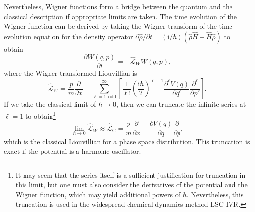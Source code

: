 Nevertheless, Wigner functions form a bridge between the quantum and the classical description if appropriate limits are taken. The time evolution of the Wigner function can be derived by taking the Wigner transform of the time-evolution equation for the density operator $\partial\hat{\rho}/\partial t = (\mathrm{i}/\hbar)(\hat{\rho}\hat{H}-\hat{H}\hat{\rho})$ to obtain\supercite{Ballentine1998}
\begin{equation}
	\frac{\partial W(q,p)}{\partial t} = -\hat{\mathcal{L}}_W W(q,p),
\end{equation}
where the Wigner transformed Liouvillian is
\begin{equation}
	\hat{\mathcal{L}}_W = \frac{p}{m} \frac{\partial}{\partial x}
	- \sum_{\ell=1,\mathrm{odd}}^{\infty}
	\left[\frac{1}{\ell!}\left(\frac{\mathrm{i}\hbar}{2}\right)^{\ell-1}\frac{\partial^{\ell} V(q)}{\partial q^{\ell}}\frac{\partial^{\ell}}{\partial p^{\ell}}\right].
\end{equation}
If we take the classical limit of $\hbar\to0$, then we can truncate the infinite series at $\ell=1$ to obtain\footnote[2]{It may seem that the series itself is a sufficient justification for truncation in this limit, but one must also consider the derivatives of the potential and the Wigner function, which may yield additional powers of $\hbar$.\supercite{Ballentine1998} Nevertheless, this truncation is used in the widespread chemical dynamics method LSC-IVR.\supercite{Shi2003}}
\begin{equation}
	\lim\limits_{\hbar\to 0}\hat{\mathcal{L}}_W \approx \hat{\mathcal{L}}_\mathrm{C} =\frac{p}{m} \frac{\partial}{\partial x}
	-\frac{\partial V(q)}{\partial q} \frac{\partial}{\partial p},
	\label{eq:liouvillian_c}
\end{equation}
which is the classical Liouvillian for a phase space distribution. This truncation is exact if the potential is a harmonic oscillator.
